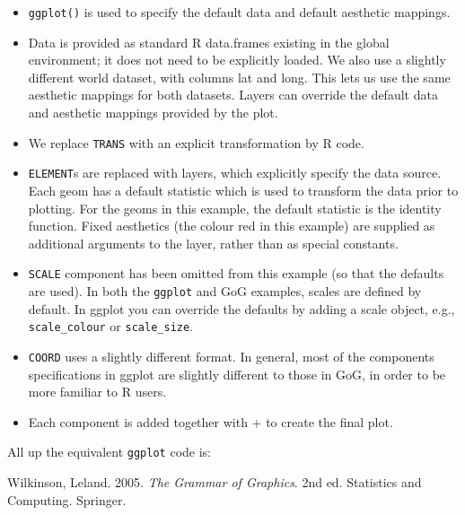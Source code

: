 \begin{itemize}
\itemsep1pt\parskip0pt
\item
  \texttt{ggplot()} is used to specify the default data and default
  aesthetic mappings.
\item
  Data is provided as standard R data.frames existing in the global
  environment; it does not need to be explicitly loaded. We also use a
  slightly different world dataset, with columns lat and long. This lets
  us use the same aesthetic mappings for both datasets. Layers can
  override the default data and aesthetic mappings provided by the plot.
\item
  We replace \texttt{TRANS} with an explicit transformation by R code.
\item
  \texttt{ELEMENT}s are replaced with layers, which explicitly specify
  the data source. Each geom has a default statistic which is used to
  transform the data prior to plotting. For the geoms in this example,
  the default statistic is the identity function. Fixed aesthetics (the
  colour red in this example) are supplied as additional arguments to
  the layer, rather than as special constants.
\item
  \texttt{SCALE} component has been omitted from this example (so that
  the defaults are used). In both the \texttt{ggplot} and GoG examples,
  scales are defined by default. In ggplot you can override the defaults
  by adding a scale object, e.g., \texttt{scale\_colour} or
  \texttt{scale\_size}.
\item
  \texttt{COORD} uses a slightly different format. In general, most of
  the components specifications in ggplot are slightly different to
  those in GoG, in order to be more familiar to R users.
\item
  Each component is added together with \(+\) to create the final plot.
\end{itemize}

All up the equivalent \texttt{ggplot} code is:

\begin{Shaded}
\begin{Highlighting}[]
\StringTok{ }
   \StringTok{ }\NormalTok{))}

\StringTok{ }
\StringTok{  }\NormalTok{(} 
\StringTok{  }\NormalTok{(}\NormalTok{(}  \NormalTok{) +}
\StringTok{  }\NormalTok{(} \NormalTok{)}
\end{Highlighting}
\end{Shaded}

Wilkinson, Leland. 2005. \emph{The Grammar of Graphics}. 2nd ed.
Statistics and Computing. Springer.
